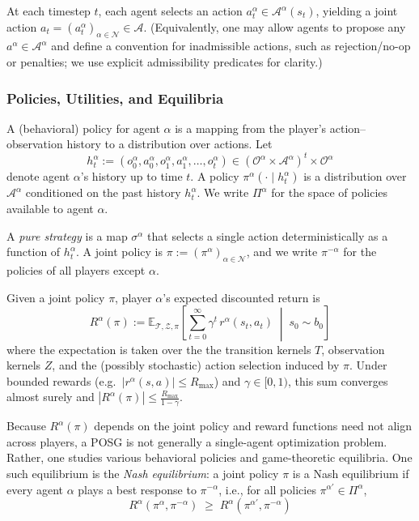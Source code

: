 \documentclass[letterpaper]{article} %
\begin{document}
At each timestep $t$, each agent selects an action $a_t^\alpha\in \mathcal{A}^\alpha(s_t)$, yielding a joint action
$a_t=(a_t^\alpha)_{\alpha\in\mathcal{N}}\in\mathcal{A}$.
(Equivalently, one may allow agents to propose any $a^\alpha\in\mathcal{A}^\alpha$ and define a convention for inadmissible actions,
such as rejection/no-op or penalties; we use explicit admissibility predicates for clarity.)

\subsubsection{Policies, Utilities, and Equilibria}

A (behavioral) policy for agent $\alpha$ is a mapping from the player's action--observation history to a distribution over actions.
Let
\[
h^\alpha_t := (o^\alpha_0,a^\alpha_0,o^\alpha_1,a^\alpha_1,\dots,o^\alpha_t)\in(\mathcal{O}^\alpha\times \mathcal{A}^\alpha)^t\times \mathcal{O}^\alpha
\]
denote agent $\alpha$'s history up to time $t$. A policy $\pi^\alpha(\cdot \mid h^\alpha_t)$ is a distribution over $\mathcal{A}^\alpha$ conditioned on the past history $h^\alpha_t$. We write $\Pi^\alpha$ for the space of policies available to agent $\alpha$.

A \emph{pure strategy} is a map $\sigma^\alpha$ that selects a single action deterministically as a function of $h^\alpha_t$. A joint policy is $\pi := (\pi^\alpha)_{\alpha\in \mathcal{N}}$, and we write $\pi^{-\alpha}$ for the policies of all players except $\alpha$.

Given a joint policy $\pi$, player $\alpha$'s expected discounted return is
\[
R^\alpha(\pi) := \mathbb{E}_{\mathcal{T},\mathcal{Z},\pi}\!\left[\sum_{t=0}^{\infty}\gamma^t\, r^\alpha(s_t,a_t)\;\middle|\; s_0\sim b_0\right]
\]
where the expectation is taken over the the transition kernels $T$, observation kernels $Z$, and the (possibly stochastic) action selection induced by $\pi$. Under bounded rewards (e.g.\ $|r^\alpha(s,a)|\le R_{\max}$) and $\gamma\in[0,1)$, this sum converges almost surely
and $|R^\alpha(\pi)|\le \frac{R_{\max}}{1-\gamma}$.

Because $R^\alpha(\pi)$ depends on the joint policy and reward functions need not align across players, a POSG is not generally a single-agent optimization problem. Rather, one studies various behavioral policies and game-theoretic equilibria. One such equilibrium is the \emph{Nash equilibrium}: a joint policy $\pi$ is a Nash equilibrium if every agent $\alpha$ plays a best response to $\pi^{-\alpha}$, i.e., for all policies $\pi^{\alpha'}\in \Pi^\alpha$,
\[
R^\alpha(\pi^\alpha,\pi^{-\alpha}) \;\ge\; R^{\alpha}(\pi^{\alpha'},\pi^{-\alpha})
\]
\end{document}

